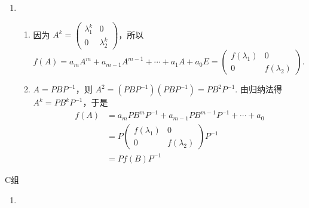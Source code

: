 \begin{enumerate}

    \item \begin{enumerate}
              \item 因为 $A^k=\begin{pmatrix}\lambda_1^k & 0 \\ 0 & \lambda_2^k\end{pmatrix}$，所以 $f(A)=a_mA^m+a_{m-1}A^{m-1}+\cdots+a_1A+a_0E = \begin{pmatrix}f(\lambda_1) & 0 \\ 0 & f(\lambda_2)\end{pmatrix}$.
              \item $A=PBP^{-1}$，则 $A^2=(PBP^{-1})(PBP^{-1})=PB^2P^{-1}$. 由归纳法得 $A^k=PB^kP^{-1}$，于是
                    \begin{align*}
                        f(A) & = a_mPB^mP^{-1}+a_{m-1}PB^{m-1}P^{-1}+\cdots+a_0                         \\
                             & =P\begin{pmatrix}f(\lambda_1) & 0 \\ 0 & f(\lambda_2)\end{pmatrix}P^{-1} \\
                             & =Pf(B)P^{-1}
                    \end{align*}
          \end{enumerate}
\end{enumerate}

\centerline{\heiti C组}
\begin{enumerate}
    \item
\end{enumerate}

\clearpage
